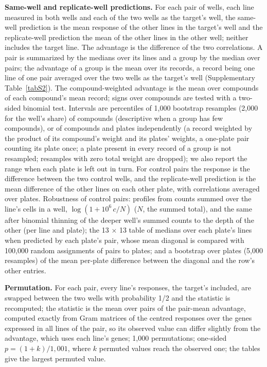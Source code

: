 \documentclass[pdflatex,sn-nature]{sn-jnl}
\begin{document}
\textbf{Same-well and replicate-well predictions.} For each pair of wells, each line measured in both wells and each of the two wells as the target's well, the same-well prediction is the mean response of the other lines in the target's well and the replicate-well prediction the mean of the other lines in the other well; neither includes the target line. The advantage is the difference of the two correlations. A pair is summarized by the medians over its lines and a group by the median over pairs; the advantage of a group is the mean over its records, a record being one line of one pair averaged over the two wells as the target's well (Supplementary Table~\ref{tabS2}). The compound-weighted advantage is the mean over compounds of each compound's mean record; signs over compounds are tested with a two-sided binomial test. Intervals are percentiles of 1,000 bootstrap resamples (2,000 for the well's share) of compounds (descriptive when a group has few compounds), or of compounds and plates independently (a record weighted by the product of its compound's weight and its plates' weights, a one-plate pair counting its plate once; a plate present in every record of a group is not resampled; resamples with zero total weight are dropped); we also report the range when each plate is left out in turn. For control pairs the response is the difference between the two control wells, and the replicate-well prediction is the mean difference of the other lines on each other plate, with correlations averaged over plates. Robustness of control pairs: profiles from counts summed over the line's cells in a well, $\log(1+10^6\,c/N)$ ($N$, the summed total), and the same after binomial thinning of the deeper well's summed counts to the depth of the other (per line and plate); the 13 $\times$ 13 table of medians over each plate's lines when predicted by each plate's pair, whose mean diagonal is compared with 100,000 random assignments of pairs to plates; and a bootstrap over plates (5,000 resamples) of the mean per-plate difference between the diagonal and the row's other entries.

\textbf{Permutation.} For each pair, every line's responses, the target's included, are swapped between the two wells with probability 1/2 and the statistic is recomputed; the statistic is the mean over pairs of the pair-mean advantage, computed exactly from Gram matrices of the centred responses over the genes expressed in all lines of the pair, so its observed value can differ slightly from the advantage, which uses each line's genes; 1,000 permutations; one-sided $p=(1+k)/1{,}001$, where $k$ permuted values reach the observed one; the tables give the largest permuted value.
\end{document}
